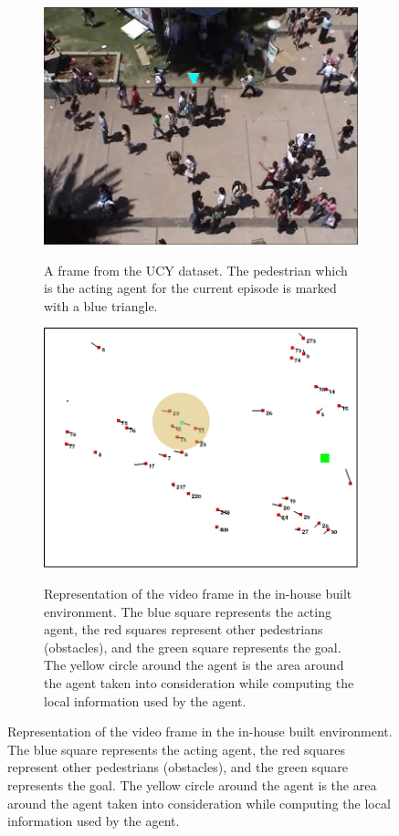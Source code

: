 \begin{figure}
	\label{fig:agent-perspective-risk-features}
	\begin{subfigure}[t]{.5\linewidth}

		\includegraphics[width=.95\textwidth]{figures/screenshot_video_frame_agent_perspective.png}
		\label{fig:agent-perspective_screenshot}
		\caption{A frame from the UCY dataset. The pedestrian which is the acting agent for the current episode is marked with a blue triangle.}
	\end{subfigure}
	\begin{subfigure}[t]{.5\linewidth}
		\centering
		\includegraphics[width=.95\textwidth]{figures/env_screenshot_agent_perspective.png}
		\label{fig:agent-perspective_env}
		\centering
		\caption{Representation of the video frame in the in-house built environment. The blue square represents the acting agent, the red squares represent other pedestrians (obstacles), and the green square represents the goal. The yellow circle around the agent is the area around the agent taken into consideration while computing the local information used by the agent.} 

\end{subfigure}
\end{figure}
